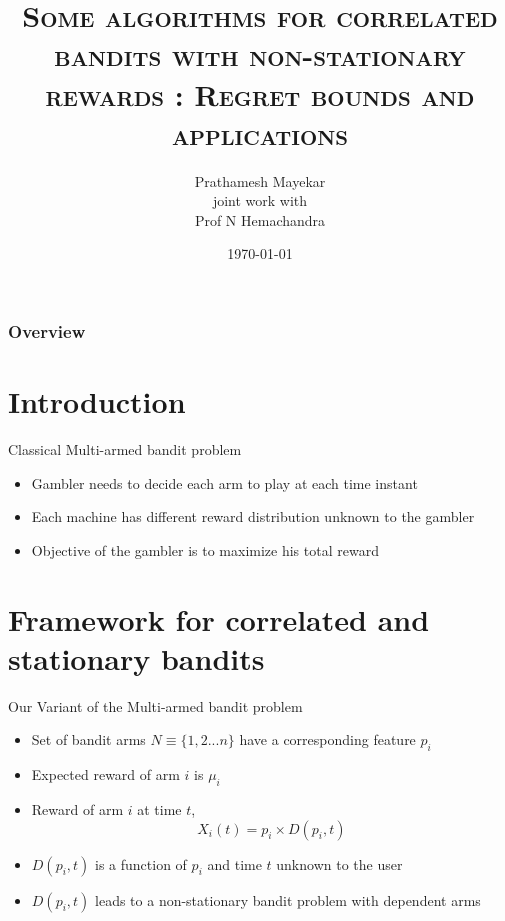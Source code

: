 \documentclass[compress, serif, onlymath, professionalfonts]{beamer}
\title[Some algorithms for correlated bandits with non-stationary rewards : { Regret bounds and applications} ]{\textsc{Some algorithms for correlated bandits with non-stationary rewards : { Regret bounds and applications} }}
\subtitle{}
\author[Prathamesh Mayekar]{\large{Prathamesh Mayekar} \\  \small{joint work with \\ Prof N Hemachandra}}
\institute[IEOR@IITB]{

\begin{center}
\end{center}
Industrial Engineering and Operations Research\\ Indian Institute of Technology Bombay}
\date{\today}
\begin{document}
\begin{frame}
\titlepage
\end{frame}
\begin{frame}[t,allowframebreaks]
\frametitle{Overview}
\tableofcontents
\end{frame}
\section{Introduction}

\begin{frame}{Classical Multi-armed bandit problem}
\begin{itemize}
\item Gambler needs to decide each arm to play at each time instant
\item Each machine has different reward distribution unknown to the gambler
\item  Objective of the gambler is to maximize his total reward
\end{itemize}
\end{frame}
\section{Framework for correlated and stationary bandits}
\begin{frame}{Our Variant of the Multi-armed bandit problem}
\begin{itemize}
\item Set of bandit arms $N \equiv \{1,2...n\}$ have a corresponding feature $p_i$
\item Expected reward of arm $i$ is $\mu_i$
\item Reward of arm $i$ at time $t$, $$X_i(t)=p_i\times D(p_i,t)$$
\item $D(p_i,t)$ is a function of $p_i$ and time $t$ unknown to the user
\item $D(p_i,t)$ leads to a non-stationary bandit problem with dependent arms
\end{itemize} 
\end{frame}
\end{document}
